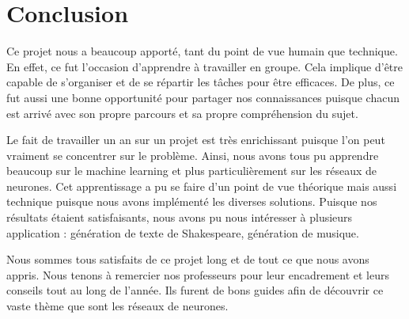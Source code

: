 
\chapter*{Conclusion}

Ce projet nous a beaucoup apporté, tant du point de vue humain que technique. En effet, ce fut l'occasion d'apprendre à travailler en groupe. Cela implique d'être capable de s'organiser et de se répartir les tâches pour être efficaces. De plus, ce fut aussi une bonne opportunité pour partager nos connaissances puisque chacun est arrivé avec son propre parcours et sa propre compréhension du sujet.

Le fait de travailler un an sur un projet est très enrichissant puisque l'on peut vraiment se concentrer sur le problème. Ainsi, nous avons tous pu apprendre beaucoup sur le machine learning et plus particulièrement sur les réseaux de neurones. Cet apprentissage a pu se faire d'un point de vue théorique mais aussi technique puisque nous avons implémenté les diverses solutions. Puisque nos résultats étaient satisfaisants, nous avons pu nous intéresser à plusieurs application : génération de texte de Shakespeare, génération de musique.

Nous sommes tous satisfaits de ce projet long et de tout ce que nous avons appris. Nous tenons à remercier nos professeurs pour leur encadrement et leurs conseils tout au long de l'année. Ils furent de bons guides afin de découvrir ce vaste thème que sont les réseaux de neurones.